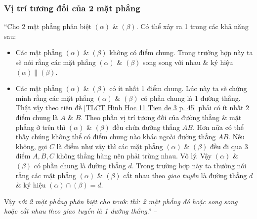 \documentclass[oneside]{book}
\numberwithin{equation}{section}
\begin{document}
\subsubsection{Vị trí tương đối của 2 mặt phẳng}
``Cho 2 mặt phẳng phân biệt $(\alpha)$ \& $(\beta)$. Có thể xảy ra 1 trong các khả năng sau:
\begin{itemize}
	\item Các mặt phẳng $(\alpha)$ \& $(\beta)$ không có điểm chung. Trong trường hợp này ta sẽ nói rằng các mặt phẳng $(\alpha)$ \& $(\beta)$ song song với nhau \& ký hiệu $(\alpha)\parallel(\beta)$.
	\item Các mặt phẳng $(\alpha)$ \& $(\beta)$ có ít nhất 1 điểm chung. Lúc này ta sẽ chứng minh rằng các mặt phẳng $(\alpha)$ \& $(\beta)$ có phần chung là 1 đường thẳng. Thật vậy theo tiên đề \ref{TLCT Hinh Hoc 11 Tien de 3 p. 45} phải có ít nhất 2 điểm chung là $A$ \& $B$. Theo phần vị trí tương đối của đường thẳng \& mặt phẳng ở trên thì $(\alpha)$ \& $(\beta)$ đều chứa đường thẳng $AB$. Hơn nữa có thể thấy chúng không thể có điểm chung nào khác ngoài đường thẳng $AB$. Nếu không, gọi $C$ là điểm như vậy thì các mặt phẳng $(\alpha)$ \& $(\beta)$ đều đi qua 3 điểm $A,B,C$ không thẳng hàng nên phải trùng nhau. Vô lý. Vậy $(\alpha)$ \& $(\beta)$ có phần chung là đường thẳng $d$. Trong trường hợp này ta thường nói rằng các mặt phẳng $(\alpha)$ \& $(\beta)$ cắt nhau theo \textit{giao tuyến} là đường thẳng $d$ \& ký hiệu $(\alpha)\cap(\beta) = d$.
\end{itemize}
Vậy \textit{với 2 mặt phẳng phân biệt cho trước thì: 2 mặt phẳng đó hoặc song song hoặc cắt nhau theo giao tuyến là 1 đường thẳng}.'' -- \cite[pp. 46--47]{TL_chuyen_Toan_Hinh_Hoc_11}
\end{document}
